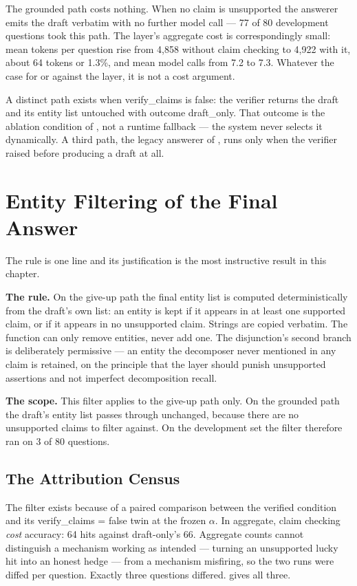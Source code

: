 The grounded path costs nothing. When no claim is unsupported the answerer emits
the draft verbatim with no further model call --- 77 of 80 development questions
took this path. The layer's aggregate cost is correspondingly small: mean tokens
per question rise from 4{,}858 without claim checking to 4{,}922 with it, about
64 tokens or 1.3\%, and mean model calls from 7.2 to 7.3. Whatever the case for
or against the layer, it is not a cost argument.

A distinct path exists when \textsf{verify\_claims} is false: the verifier
returns the draft and its entity list untouched with outcome
\textsf{draft\_only}. That outcome is the ablation condition of
, not a runtime fallback --- the system never
selects it dynamically. A third path, the legacy answerer of
, runs only when the verifier raised before producing a draft
at all.

\section{Entity Filtering of the Final Answer}\label{sec:entity-filtering}

The rule is one line and its justification is the most instructive result
in this chapter.

\textbf{The rule.} On the give-up path the final entity list is computed
deterministically from the draft's own list: an entity is kept if it appears in
at least one supported claim, or if it appears in no unsupported claim. Strings
are copied verbatim. The function can only remove entities, never add one. The
disjunction's second branch is deliberately permissive --- an entity the
decomposer never mentioned in any claim is retained, on the principle that the
layer should punish unsupported assertions and not imperfect decomposition
recall.

\textbf{The scope.} This filter applies to the give-up path only. On the
grounded path the draft's entity list passes through unchanged, because there
are no unsupported claims to filter against. On the development set the filter
therefore ran on 3 of 80 questions.

\subsection*{The Attribution Census}

The filter exists because of a paired comparison between the verified condition
and its \textsf{verify\_claims} = false twin at the frozen $\alpha$. In
aggregate, claim checking \emph{cost} accuracy: 64 hits against draft-only's 66.
Aggregate counts cannot distinguish a mechanism working as intended --- turning
an unsupported lucky hit into an honest hedge --- from a mechanism misfiring, so
the two runs were diffed per question. Exactly three questions differed.
 gives all three.

